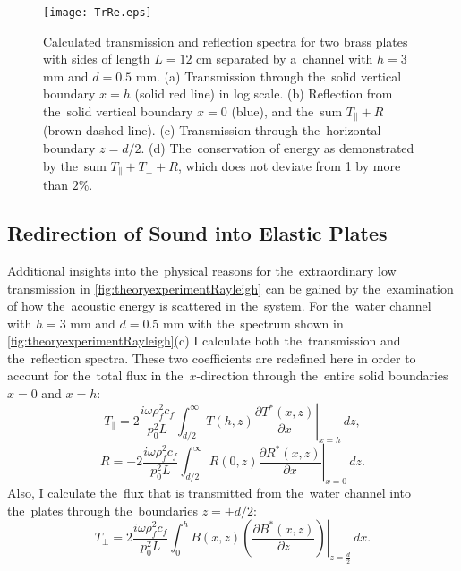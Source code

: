 \begin{figure}
\begin{center}
\texttt{[image: TrRe.eps]}
\caption{Calculated transmission and reflection spectra for two brass plates with sides of length $L=12$ cm separated by a~channel with $h =3$ mm and $d=0.5$ mm.  (a) Transmission through the~solid vertical boundary $x = h$ (solid red line) in log scale. (b) Reflection from the~solid vertical boundary $x=0$ (blue), and the~sum $T_{\|}+R$ (brown dashed line). (c) Transmission through the~horizontal boundary $z = d/2$. (d) The~conservation of energy as demonstrated by the~sum $T_{\|}+T_{\perp}+R$, which does not deviate from 1 by more than $2\%$.}
\label{fig:fig3}
\end{center}
\end{figure}

\subsection{Redirection of Sound into Elastic Plates}

Additional insights into the~physical reasons for the~extraordinary low transmission in \cref{fig:theoryexperimentRayleigh} can be gained by the~examination of how the~acoustic energy is scattered in the~system.
For the~water channel with $h=3$ mm and $d=0.5$ mm with the~spectrum shown in \cref{fig:theoryexperimentRayleigh}(c) I calculate both the~transmission and the~reflection spectra.
These two coefficients are redefined here in order to account for the~total flux in the~$x$-direction through the~entire solid boundaries $x=0$ and $x=h$:
\begin{equation}
T_{\|} = 2\frac{i \omega \rho_f^2 c_f }{p_0^2 L} \int_{d/2}^{\infty} T(h,z)\left.\frac{\partial T^{*}(x,z)}{\partial x}\right|_{x=h}\, dz,
\end{equation}
\begin{equation}
R = -2\frac{i \omega \rho_f^2 c_f }{p_0^2 L} \int_{d/2}^{\infty} R(0,z)\left.\frac{\partial R^{*}(x,z)}{\partial x}\right|_{x=0}\, dz.
\end{equation}
Also, I calculate the~flux that is transmitted from the~water channel into the~plates through the~boundaries $z=\pm d/2$:
\begin{equation}
T_{\perp} = 2\frac{i \omega \rho_f^2 c_f }{p_0^2 L} \int_{0}^{h} B(x,z)\left.\left(\frac{\partial B^{*}(x,z)}{\partial z}\right)\right|_{z=\frac{d}{2}}\, dx.
\end{equation}

